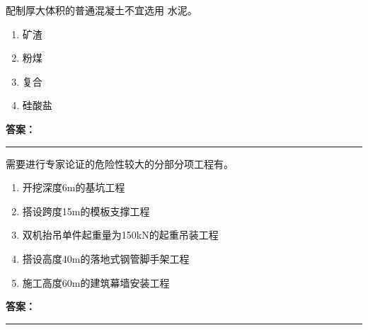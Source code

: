 \documentclass[UTF8,fontset=fandol,11pt]{ctexart}
\newcommand{\answerline}{\textcolor{answerred}{\rule{2.4cm}{0.7pt}}}
\begin{document}
\begin{quizbox}[title={乱序第 156 题｜第四章混凝土结构工程}]

配制厚大体积的普通混凝土不宜选用 水泥。\\

\begin{enumerate}[label=\Alph*.]

\item 矿渣

\item 粉煤

\item 复合

\item 硅酸盐

\end{enumerate}

\textbf{\textcolor{answerred}{答案：}} \answerline

\end{quizbox}

\vspace{0.2em}

\begin{quizbox}[title={乱序第 157 题｜第七章脚手架工程}]

需要进行专家论证的危险性较大的分部分项工程有。\\

\begin{enumerate}[label=\Alph*.]

\item 开挖深度6m的基坑工程

\item 搭设跨度15m的模板支撑工程

\item 双机抬吊单件起重量为150kN的起重吊装工程

\item 搭设高度40m的落地式钢管脚手架工程

\item 施工高度60m的建筑幕墙安装工程

\end{enumerate}

\textbf{\textcolor{answerred}{答案：}} \answerline

\end{quizbox}

\vspace{0.2em}
\end{document}
